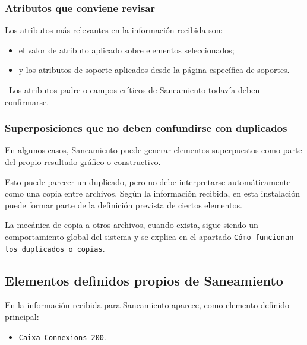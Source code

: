 
\subsubsection{Atributos que conviene revisar}

Los atributos más relevantes en la información recibida son:

\begin{itemize}
\item el valor de atributo aplicado sobre elementos seleccionados;
\item y los atributos de soporte aplicados desde la página específica de soportes.
\end{itemize}

\pendingtag\ Los atributos padre o campos críticos de Saneamiento todavía deben confirmarse.


\subsubsection{Superposiciones que no deben confundirse con duplicados}

En algunos casos, Saneamiento puede generar elementos superpuestos como parte del propio resultado gráfico o constructivo.

Esto puede parecer un duplicado, pero no debe interpretarse automáticamente como una copia entre archivos. Según la información recibida, en esta instalación puede formar parte de la definición prevista de ciertos elementos.

La mecánica de copia a otros archivos, cuando exista, sigue siendo un comportamiento global del sistema y se explica en el apartado \texttt{Cómo funcionan los duplicados o copias}.

\subsection{Elementos definidos propios de Saneamiento}

En la información recibida para Saneamiento aparece, como elemento definido principal:

\begin{itemize}
\item \texttt{Caixa Connexions 200}.
\end{itemize}

